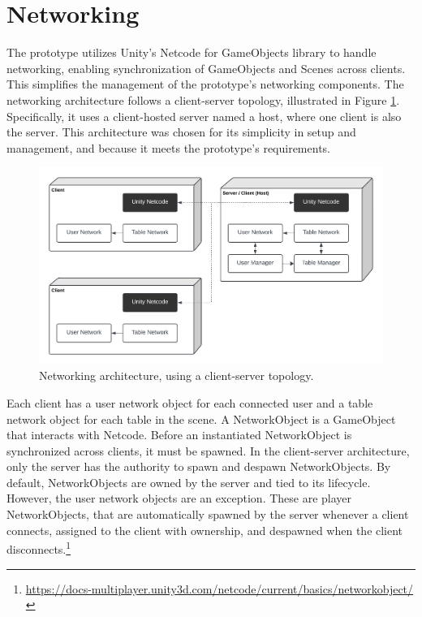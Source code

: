 \section{Networking}

    The prototype utilizes Unity's Netcode for GameObjects library to handle networking, enabling synchronization of GameObjects and Scenes across clients. This simplifies the management of the prototype's networking components. The networking architecture follows a client-server topology, illustrated in Figure \ref{fig:topology}. Specifically, it uses a client-hosted server named a host, where one client is also the server. This architecture was chosen for its simplicity in setup and management, and because it meets the prototype's requirements.

    \begin{figure}[h]
        \centering
        \includegraphics[width=.9\linewidth]{figures/topology.png}
        \caption{Networking architecture, using a client-server topology.}
        \label{fig:topology}
    \end{figure}

    Each client has a user network object for each connected user and a table network object for each table in the scene. A NetworkObject is a GameObject that interacts with Netcode. Before an instantiated NetworkObject is synchronized across clients, it must be spawned. In the client-server architecture, only the server has the authority to spawn and despawn NetworkObjects. By default, NetworkObjects are owned by the server and tied to its lifecycle. However, the user network objects are an exception. These are player NetworkObjects, that are automatically spawned by the server whenever a client connects, assigned to the client with ownership, and despawned when the client disconnects.\footnote{\url{https://docs-multiplayer.unity3d.com/netcode/current/basics/networkobject/}}


